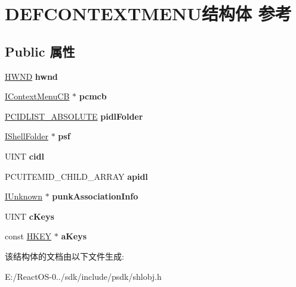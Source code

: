 \hypertarget{struct_d_e_f_c_o_n_t_e_x_t_m_e_n_u}{}\section{D\+E\+F\+C\+O\+N\+T\+E\+X\+T\+M\+E\+N\+U结构体 参考}
\label{struct_d_e_f_c_o_n_t_e_x_t_m_e_n_u}
\subsection*{Public 属性}
\begin{DoxyCompactItemize}
\item 
\mbox{\label{struct_d_e_f_c_o_n_t_e_x_t_m_e_n_u_a05509f7d0f2a8068b70b2cd62f4a5bcb}} 
\hyperlink{interfacevoid}{H\+W\+ND} {\bfseries hwnd}
\item 
\mbox{\label{struct_d_e_f_c_o_n_t_e_x_t_m_e_n_u_a1361c6b5e264e8725b78f297d7d1a744}} 
\hyperlink{interface_i_context_menu_c_b}{I\+Context\+Menu\+CB} $\ast$ {\bfseries pcmcb}
\item 
\mbox{\label{struct_d_e_f_c_o_n_t_e_x_t_m_e_n_u_afcedf5a09663ef3960509d2a1f89f6f4}} 
\hyperlink{struct___i_t_e_m_i_d_l_i_s_t___a_b_s_o_l_u_t_e}{P\+C\+I\+D\+L\+I\+S\+T\+\_\+\+A\+B\+S\+O\+L\+U\+TE} {\bfseries pidl\+Folder}
\item 
\mbox{\label{struct_d_e_f_c_o_n_t_e_x_t_m_e_n_u_a670fae4b774c3f25d3f3a5ea8dddb3f8}} 
\hyperlink{interface_i_shell_folder}{I\+Shell\+Folder} $\ast$ {\bfseries psf}
\item 
\mbox{\label{struct_d_e_f_c_o_n_t_e_x_t_m_e_n_u_a47ded44809bf1999c8543c318ecf1e64}} 
U\+I\+NT {\bfseries cidl}
\item 
\mbox{\label{struct_d_e_f_c_o_n_t_e_x_t_m_e_n_u_ae28301ef372a24d572d4c2466cd159d9}} 
P\+C\+U\+I\+T\+E\+M\+I\+D\+\_\+\+C\+H\+I\+L\+D\+\_\+\+A\+R\+R\+AY {\bfseries apidl}
\item 
\mbox{\label{struct_d_e_f_c_o_n_t_e_x_t_m_e_n_u_aa6642eae29a2d76239fe1f59d0d7b139}} 
\hyperlink{interface_i_unknown}{I\+Unknown} $\ast$ {\bfseries punk\+Association\+Info}
\item 
\mbox{\label{struct_d_e_f_c_o_n_t_e_x_t_m_e_n_u_ab497e85a1a0b4f9b400af2b4597c81ef}} 
U\+I\+NT {\bfseries c\+Keys}
\item 
\mbox{\label{struct_d_e_f_c_o_n_t_e_x_t_m_e_n_u_ae2c4e7bd039385a5945c1047e16a2a36}} 
const \hyperlink{interfacevoid}{H\+K\+EY} $\ast$ {\bfseries a\+Keys}
\end{DoxyCompactItemize}


该结构体的文档由以下文件生成\+:\begin{DoxyCompactItemize}
\item 
E\+:/\+React\+O\+S-\/0../sdk/include/psdk/shlobj.\+h\end{DoxyCompactItemize}
